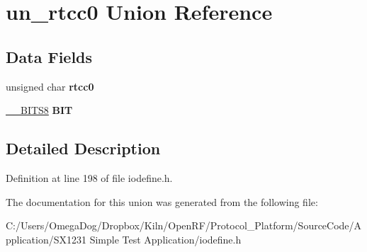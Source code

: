 \hypertarget{unionun__rtcc0}{\section{un\-\_\-rtcc0 Union Reference}
\label{unionun__rtcc0}
}
\subsection*{Data Fields}
\begin{DoxyCompactItemize}
\item 
\hypertarget{unionun__rtcc0_aa4b449cf68d6ec72a8eb169e1d70a082}{unsigned char {\bfseries rtcc0}}\label{unionun__rtcc0_aa4b449cf68d6ec72a8eb169e1d70a082}

\item 
\hypertarget{unionun__rtcc0_a662fda767bb130c24c84919d3eae1990}{\hyperlink{struct_____b_i_t_s8}{\-\_\-\-\_\-\-B\-I\-T\-S8} {\bfseries B\-I\-T}}\label{unionun__rtcc0_a662fda767bb130c24c84919d3eae1990}

\end{DoxyCompactItemize}


\subsection{Detailed Description}


Definition at line 198 of file iodefine.\-h.



The documentation for this union was generated from the following file\-:\begin{DoxyCompactItemize}
\item 
C\-:/\-Users/\-Omega\-Dog/\-Dropbox/\-Kiln/\-Open\-R\-F/\-Protocol\-\_\-\-Platform/\-Source\-Code/\-Application/\-S\-X1231 Simple Test Application/iodefine.\-h\end{DoxyCompactItemize}
